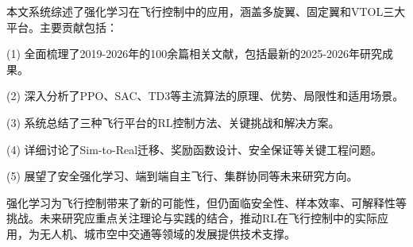 \documentclass[12pt,a4paper]{ctexart}
\begin{document}
本文系统综述了强化学习在飞行控制中的应用，涵盖多旋翼、固定翼和VTOL三大平台。主要贡献包括：

(1) 全面梳理了2019-2026年的100余篇相关文献，包括最新的2025-2026年研究成果。

(2) 深入分析了PPO、SAC、TD3等主流算法的原理、优势、局限性和适用场景。

(3) 系统总结了三种飞行平台的RL控制方法、关键挑战和解决方案。

(4) 详细讨论了Sim-to-Real迁移、奖励函数设计、安全保证等关键工程问题。

(5) 展望了安全强化学习、端到端自主飞行、集群协同等未来研究方向。

强化学习为飞行控制带来了新的可能性，但仍面临安全性、样本效率、可解释性等挑战。未来研究应重点关注理论与实践的结合，推动RL在飞行控制中的实际应用，为无人机、城市空中交通等领域的发展提供技术支撑。
\end{document}
